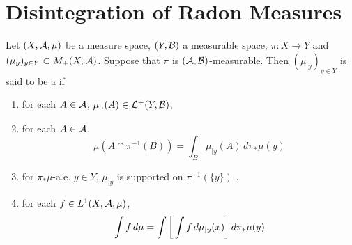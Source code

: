 \documentclass{book}
\begin{document}
	
	
	
	
	
	
	
	
	
	
	
	
	
	
	
	
	
	
	
	
	
	
	
	
	
	
	
	
	
	
	
	
	
	
	
	
	
	
	
	
	
	
	
	
	
	
	
	
	
	
	
	
\newpage
\section{Disintegration of Radon Measures}

  

\tcr{}

\begin{defn}
	Let $(X, \mathcal{A}, \mu)$ be a measure space, $(Y, \mathcal{B})$ a measurable space, $\pi: X \rightarrow Y$ and $(\mu_y)_{y \in Y} \subset M_+(X, \mathcal{A})$. Suppose that $\pi$ is $(\mathcal{A}, \mathcal{B})$-measurable. Then $(\mu_{|y})_{y \in Y}$ is said to be a  if 
	\begin{enumerate}
		\item for each $A \in \mathcal{A}$, $\mu_{| \cdot}(A) \in \mathcal{L}^+(Y, \mathcal{B})$,
		\item for each $A \in \mathcal{A}$, 
		$$\mu(A \cap \pi^{-1}(B)) = \int_B \mu_{|y}(A) \, d \pi_*\mu(y) $$
		\item for $\pi_*\mu$-a.e. $y \in Y$, $\mu_{|y}$ is supported on $\pi^{-1}(\{y\})$ . 
		\item for each $f \in L^1(X, \mathcal{A}, \mu)$, 
		$$\int f \, d \mu = \int \bigg[ \int f \, d\mu_{|y}(x) \bigg] \, d \pi_*\mu(y)$$ 
	\end{enumerate}
\end{defn}
\end{document}
